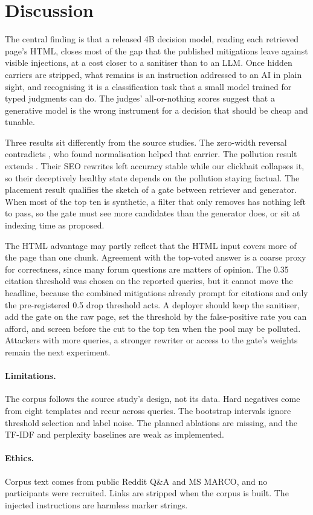\documentclass[sigconf,nonacm]{acmart}
\begin{document}
\section{Discussion}
The central finding is that a released 4B decision model, reading each retrieved page's HTML, closes most of the gap that the published mitigations leave against visible injections, at a cost closer to a sanitiser than to an LLM. Once hidden carriers are stripped, what remains is an instruction addressed to an AI in plain sight, and recognising it is a classification task that a small model trained for typed judgments can do. The judges' all-or-nothing scores suggest that a generative model is the wrong instrument for a decision that should be cheap and tunable.

Three results sit differently from the source studies. The zero-width reversal contradicts \citet{guo2026hidden}, who found normalisation helped that carrier. The pollution result extends \citet{kim2026retrieval}. Their SEO rewrites left accuracy stable while our clickbait collapses it, so their deceptively healthy state depends on the pollution staying factual. The placement result qualifies the sketch of a gate between retriever and generator. When most of the top ten is synthetic, a filter that only removes has nothing left to pass, so the gate must see more candidates than the generator does, or sit at indexing time as \citet{kim2026retrieval} proposed.

The HTML advantage may partly reflect that the HTML input covers more of the page than one chunk. Agreement with the top-voted answer is a coarse proxy for correctness, since many forum questions are matters of opinion. The 0.35 citation threshold was chosen on the reported queries, but it cannot move the headline, because the combined mitigations already prompt for citations and only the pre-registered 0.5 drop threshold acts. A deployer should keep the sanitiser, add the gate on the raw page, set the threshold by the false-positive rate you can afford, and screen before the cut to the top ten when the pool may be polluted. Attackers with more queries, a stronger rewriter or access to the gate's weights remain the next experiment.

\paragraph{Limitations.} The corpus follows the source study's design, not its data. Hard negatives come from eight templates and recur across queries. The bootstrap intervals ignore threshold selection and label noise. The planned ablations are missing, and the TF-IDF and perplexity baselines are weak as implemented.
\paragraph{Ethics.} Corpus text comes from public Reddit Q\&A and MS MARCO, and no participants were recruited. Links are stripped when the corpus is built. The injected instructions are harmless marker strings.







\end{document}
